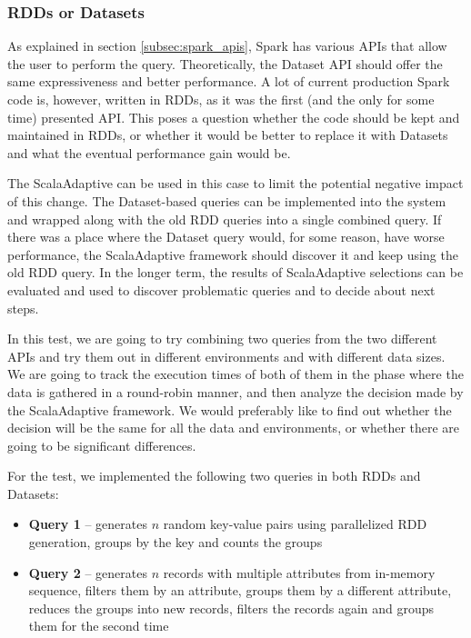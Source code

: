 \subsubsection{RDDs or Datasets}

As explained in section \ref{subsec:spark_apis}, Spark has various APIs that allow the user to perform the query. Theoretically, the Dataset API should offer the same expressiveness and better performance. A lot of current production Spark code is, however, written in RDDs, as it was the first (and the only for some time) presented API. This poses a question whether the code should be kept and maintained in RDDs, or whether it would be better to replace it with Datasets and what the eventual performance gain would be.

The ScalaAdaptive can be used in this case to limit the potential negative impact of this change. The Dataset-based queries can be implemented into the system and wrapped along with the old RDD queries into a single combined query. If there was a place where the Dataset query would, for some reason, have worse performance, the ScalaAdaptive framework should discover it and keep using the old RDD query. In the longer term, the results of ScalaAdaptive selections can be evaluated and used to discover problematic queries and to decide about next steps.

In this test, we are going to try combining two queries from the two different APIs and try them out in different environments and with different data sizes. We are going to track the execution times of both of them in the phase where the data is gathered in a round-robin manner, and then analyze the decision made by the ScalaAdaptive framework. We would preferably like to find out whether the decision will be the same for all the data and environments, or whether there are going to be significant differences.

For the test, we implemented the following two queries in both RDDs and Datasets:
\begin{itemize}
	\item \textbf{Query 1} -- generates $n$ random key-value pairs using parallelized RDD generation, groups by the key and counts the groups
	\item \textbf{Query 2} -- generates $n$ records with multiple attributes from in-memory sequence, filters them by an attribute, groups them by a different attribute, reduces the groups into new records, filters the records again and groups them for the second time
\end{itemize}

